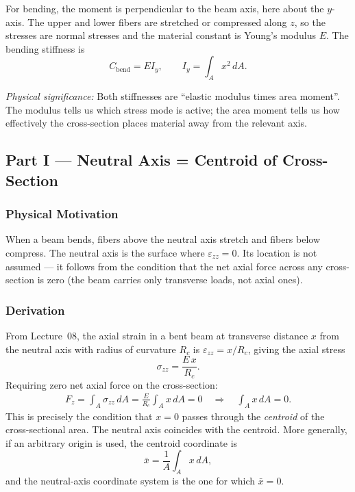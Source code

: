 \documentclass[../main.tex]{subfiles}
\begin{document}
For bending, the moment is perpendicular to the beam axis, here about the $y$-axis. The upper and lower fibers are stretched or compressed along $z$, so the stresses are normal stresses and the material constant is Young's modulus $E$. The bending stiffness is
\begin{equation}
  \boxed{C_{\mathrm{bend}} = E I_y,
  \qquad
  I_y = \int_A x^2\,dA.}
  \label{eq:lec09_bending_stiffness}
\end{equation}

\textit{Physical significance:} Both stiffnesses are ``elastic modulus times area moment''. The modulus tells us which stress mode is active; the area moment tells us how effectively the cross-section places material away from the relevant axis.

\subsection*{Part I — Neutral Axis = Centroid of Cross-Section}

\subsubsection*{Physical Motivation}
When a beam bends, fibers above the neutral axis stretch and fibers below compress. The neutral axis is the surface where $\varepsilon_{zz}=0$. Its location is not assumed — it follows from the condition that the net axial force across any cross-section is zero (the beam carries only transverse loads, not axial ones).

\subsubsection*{Derivation}
From Lecture~08, the axial strain in a bent beam at transverse distance $x$ from the neutral axis with radius of curvature $R_c$ is $\varepsilon_{zz}=x/R_c$, giving the axial stress
\begin{equation}
  \sigma_{zz} = \frac{E\,x}{R_c}.
  \label{eq:lec09_axial_stress}
\end{equation}
Requiring zero net axial force on the cross-section:
\begin{align}
  F_z = \int_A \sigma_{zz}\,dA = \frac{E}{R_c}\int_A x\,dA = 0
  \quad\Rightarrow\quad
  \boxed{\int_A x\,dA = 0.}
  \label{eq:lec09_centroid}
\end{align}
This is precisely the condition that $x=0$ passes through the \emph{centroid} of the cross-sectional area. The neutral axis coincides with the centroid. More generally, if an arbitrary origin is used, the centroid coordinate is
\begin{equation}
  \bar{x} = \frac{1}{A}\int_A x\,dA,
  \label{eq:lec09_centroid_coordinate}
\end{equation}
and the neutral-axis coordinate system is the one for which $\bar{x}=0$.
\end{document}
